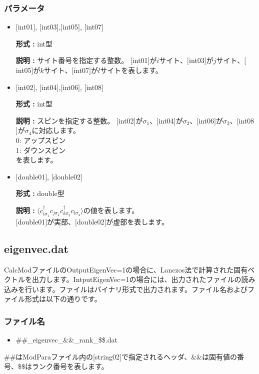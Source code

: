 \subsubsection{パラメータ}
 \begin{itemize}

  \item  $[$int01$]$, $[$int03$]$,$[$int05$]$, $[$int07$]$

 {\bf 形式 :} int型

{\bf 説明 :} サイト番号を指定する整数。
$[$int01$]$が$i$サイト、$[$int03$]$が$j$サイト、$[$int05$]$が$k$サイト、$[$int07$]$が$l$サイトを表します。
 
  \item  $[$int02$]$, $[$int04$]$,$[$int06$]$, $[$int08$]$

 {\bf 形式 :} int型 

{\bf 説明 :} スピンを指定する整数。
$[$int02$]$が$\sigma_1$、$[$int04$]$が$\sigma_2$、$[$int06$]$が$\sigma_3$、$[$int08$]$が$\sigma_4$に対応します。\\
0: アップスピン\\
1: ダウンスピン\\
を表します。

  \item  $[$double01$]$, $[$double02$]$

 {\bf 形式 :} double型 

{\bf 説明 :} $\langle c_{i\sigma_1}^{\dagger}c_{j\sigma_2}c_{k\sigma_3}^{\dagger}c_{l\sigma_4}\rangle$の値を表します。\\
$[$double01$]$が実部、$[$double02$]$が虚部を表します。\\
\end{itemize}

\newpage
\subsection{eigenvec.dat}
\label{Subsec:eigenvec}
CalcModファイルのOutputEigenVec=1の場合に、Lanczos法で計算された固有ベクトルを出力します。IntputEigenVec=1の場合には、出力されたファイルの読み込みを行います。ファイルはバイナリ形式で出力されます。ファイル名およびファイル形式は以下の通りです。

\subsubsection{ファイル名}
\begin{itemize}
   \item{\#\#\_eigenvec\_{\&\&}\_rank\_\$\$.dat}
\end{itemize}
  \#\#はModParaファイル内の[string02]で指定されるヘッダ、\&\&は固有値の番号、\$\$はランク番号を表します。


